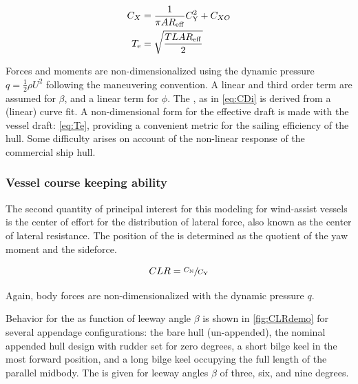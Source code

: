 \documentclass[twoside,twocolumn]{article}
\begin{document}
\begin{subequations}
	\begin{align}
	C_{X}&=\frac{1}{\pi AR_\mathrm{eff}}C_\mathrm{Y}^2+C_{XO} 
	\label{eq:CDi}\\
	T_\mathrm{e}&=\sqrt{\dfrac{TLAR_\mathrm{eff}}{2}} 
	\label{eq:Te}
	\end{align}
\end{subequations}

\noindent
Forces and moments are non-dimensionalized using the dynamic pressure $q=\frac{1}{2}\rho U^2 $ following the maneuvering convention. A linear and third order term are assumed for $\beta$, and a linear term for $\phi$. The \ARe, as in \cref{eq:CDi} is derived from a (linear) curve fit. A non-dimensional form for the effective draft \Te is made with the vessel draft: \TeT \cref{eq:Te}, providing a convenient metric for the sailing efficiency of the hull. Some difficulty arises on account of the non-linear response of the commercial ship hull.

\subsubsection{Vessel course keeping ability}
The second quantity of principal interest for this modeling for wind-assist vessels is the center of effort for the distribution of lateral force, also known as the center of lateral resistance. The position of the \CLR is determined as the quotient of the yaw moment and the sideforce.

\begin{equation}
CLR=\sfrac{C_\mathrm{N}}{C_\mathrm{Y}}
\end{equation}

\noindent
Again, body forces are non-dimensionalized with the dynamic pressure $q$.

Behavior for the \CLR as function of leeway angle $\beta$ is shown in \cref{fig:CLRdemo} for several appendage configurations: the bare hull (un-appended), the nominal appended hull design with rudder set for zero degrees, a short bilge keel in the most forward position, and a long bilge keel occupying the full length of the parallel midbody. The \CLR is given for leeway angles $\beta$ of three, six, and nine degrees. 
\end{document}
